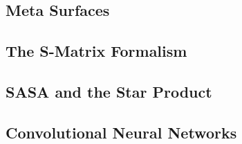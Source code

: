\subsection{Meta Surfaces}

\subsection{The S-Matrix Formalism}

\subsection{SASA and the Star Product}

\subsection{Convolutional Neural Networks}
